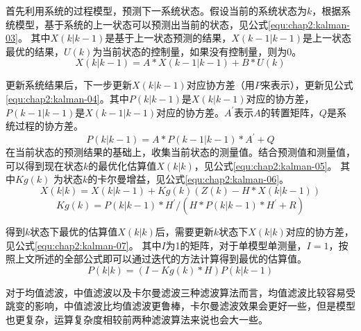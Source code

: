 \par 首先利用系统的过程模型，预测下一系统状态。假设当前的系统状态为$k$，根据系统模型，基于系统的上一状态可以预测出当前的状态，见公式\ref{equ:chap2:kalman-03}。 其中$X(k|k-1)$是基于上一状态预测的结果，$X(k-1|k-1)$是上一状态最优的结果，$U(k)$为当前状态的控制量，如果没有控制量，则为0。
\begin{equation}
\label{equ:chap2:kalman-03}
X(k|k-1)=A \ast X(k-1|k-1)+B \ast U(k)
\end{equation}
\par 更新系统结果后，下一步更新$X(k|k-1)$对应协方差（用$P$来表示），更新见公式\ref{equ:chap2:kalman-04}。其中$P(k|k-1)$是$X(k|k-1)$对应的协方差，$P(k-1|k-1)$是$X(k-1|k-1)$对应的协方差。$A^{'}$表示$A$的转置矩阵，$Q$是系统过程的协方差。
\begin{equation}
\label{equ:chap2:kalman-04}
P(k|k-1)=A \ast P(k-1|k-1) \ast A^{'}+Q
\end{equation}
在当前状态的预测结果的基础上，收集当前状态的测量值。结合预测值和测量值，可以得到现在状态$k$的最优化估算值$X(k|k)$，见公式\ref{equ:chap2:kalman-05}。 其中$Kg(k)$ 为状态$k$的卡尔曼增益，见公式\ref{equ:chap2:kalman-06}。
\begin{equation}
\label{equ:chap2:kalman-05}
X(k|k)=X(k|k-1)+Kg(k)(Z(k)-H \ast X(k|k-1))
\end{equation}
\begin{equation}
\label{equ:chap2:kalman-06}
Kg(k)=P(k|k-1) \ast H^{'}/(H \ast P(k|k-1) \ast H^{'}+R)
\end{equation}
\par 得到$k$状态下最优的估算值$X(k|k)$后，需要更新$k$状态下$X(k|k)$对应的协方差，见公式\ref{equ:chap2:kalman-07}。 其中$I$为1的矩阵，对于单模型单测量，$I=1$，按照上文所述的全部公式即可以通过迭代的方法计算得到最优的估算值。
\begin{equation}
\label{equ:chap2:kalman-07}
P(k|k)=(I-Kg(k) \ast H)P(k|k-1)
\end{equation}
\par 对于均值滤波，中值滤波以及卡尔曼滤波三种滤波算法而言，均值滤波比较容易受跳变的影响，中值滤波比均值滤波更鲁棒，卡尔曼滤波效果会更好一些，但是模型也更复杂，运算复杂度相较前两种滤波算法来说也会大一些。
